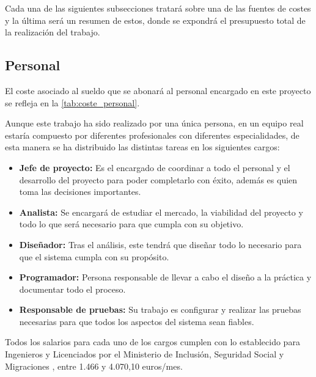 Cada una de las siguientes subsecciones tratará sobre una de las fuentes de costes y la última será un resumen de estos, donde se expondrá el presupuesto total de la realización del trabajo.

\subsection{Personal}
El coste asociado al sueldo que se abonará al personal encargado en este proyecto se refleja en la \autoref{tab:coste_personal}.

Aunque este trabajo ha sido realizado por una única persona, en un equipo real estaría compuesto por diferentes profesionales con diferentes especialidades, de esta manera se ha distribuido las distintas tareas en los siguientes cargos:
\begin{itemize}
	\item \textbf{Jefe de proyecto:} Es el encargado de coordinar a todo el personal y el desarrollo del proyecto para poder completarlo con éxito, además es quien toma las decisiones importantes.
	\item \textbf{Analista:} Se encargará de estudiar el mercado, la viabilidad del proyecto y todo lo que será necesario para que cumpla con su objetivo.
	\item \textbf{Diseñador:} Tras el análisis, este tendrá que diseñar todo lo necesario para que el sistema cumpla con su propósito.
	\item \textbf{Programador:} Persona responsable de llevar a cabo el diseño a la práctica y documentar todo el proceso.
	\item \textbf{Responsable de pruebas:} Su trabajo es configurar y realizar las pruebas necesarias para que todos los aspectos del sistema sean fiables.
\end{itemize}

Todos los salarios para cada uno de los cargos cumplen con lo establecido para Ingenieros y Licenciados por el Ministerio de Inclusión, Seguridad Social y Migraciones \cite{noauthor_seguridad_nodate}, entre 1.466 y 4.070,10 euros/mes.


